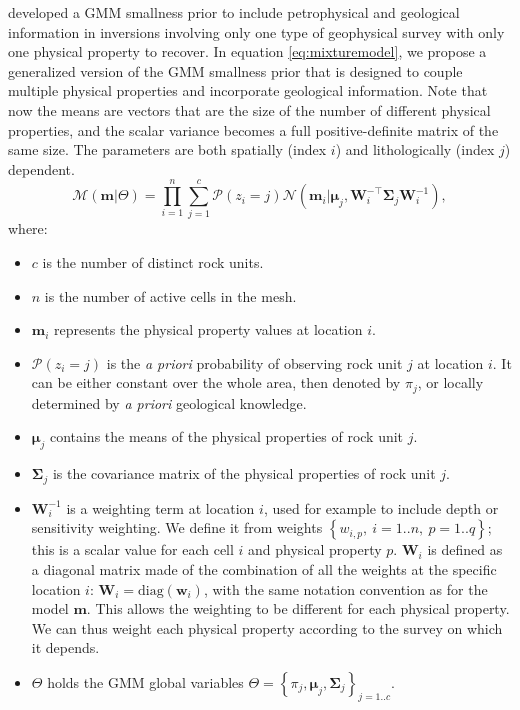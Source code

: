 \documentclass[extra, mreferee]{gji_joint} %
\begin{document}
\citet{ggz389} developed a GMM smallness prior to include petrophysical and geological information in inversions involving only one type of geophysical survey with only one physical property to recover. In equation \eqref{eq:mixturemodel}, we propose a generalized version of the GMM smallness prior that is designed to couple multiple physical properties and incorporate geological information. Note that now the means are vectors that are the size of the number of different physical properties, and the scalar variance becomes a full positive-definite matrix of the same size. The parameters are both spatially (index $i$) and lithologically (index $j$) dependent.
\begin{equation}
\mathcal{M}(\mathbf{m}|\Theta) = \prod_{i=1}^n \sum_{j=1}^c \mathcal{P}(z_{i}=j)\mathcal{N}(\mathbf{m}_i|\mathbf{\mu}_j, \mathbf{W}_i^{-\top}\mathbf{\Sigma}_j\mathbf{W}_i^{-1}),
\label{eq:mixturemodel}
\end{equation}
where:
\newpage
\begin{itemize}
\item $c$ is the number of distinct rock units.
\item $n$ is the number of active cells in the mesh.
\item $\mathbf{m}_i$ represents the physical property values at location $i$.
\item $\mathcal{P}(z_{i}=j)$ is the \textit{a priori} probability of observing rock unit $j$ at location $i$. It can be either constant over the whole area, then denoted by $\pi_j$, or locally determined by \textit{a priori} geological knowledge.
\item $\mathbf{\mu}_j$ contains the means of the physical properties of rock unit $j$.
\item $\mathbf{\Sigma}_j$ is the covariance matrix of the physical properties of rock unit $j$.
\item $\mathbf{W}_i^{-1}$ is a weighting term at location $i$, used for example to include depth or sensitivity weighting. We define it from weights $\left\{{w}_{i, p}, ~i=1..n, ~p=1..q\right\}$; this is a scalar value for each cell $i$ and physical property $p$. $\mathbf{W}_i$ is defined as a diagonal matrix made of the combination of all the weights at the specific location $i$: $\mathbf{W}_i = \text{diag}(\mathbf{w}_{i})$, with the same notation convention as for the model $\mathbf{m}$. This allows the weighting to be different for each physical property. We can thus weight each physical property according to the survey on which it depends.
\item $\Theta$ holds the GMM global variables $\Theta= \left\{\pi_j, \mathbf{\mu}_j, \mathbf{\Sigma}_j\right\}_{j=1..c}$.
\end{itemize}
\end{document}
